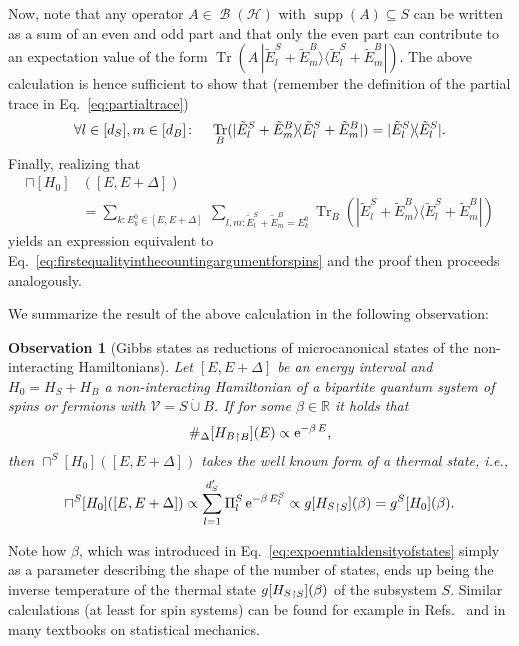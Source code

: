 \documentclass[a4paper,12pt,listof=totoc,index=totoc,bibliography=totoc,headsepline=false,headings=normal,BCOR16.153846mm,DIV12,headinclude,twoside,cleardoublepage=empty,numbers=noenddot,final]{scrreprt}
\theoremstyle{mystyle}
\numberwithin{equation}{section}
\numberwithin{figure}{section}
\numberwithin{lemma}{section}
\numberwithin{theorem}{section}
\numberwithin{corollary}{section}
\numberwithin{definition}{section}
\numberwithin{conjecture}{section}
\newtheorem{observation}{Observation}
\numberwithin{observation}{section}
\newcommand{\+}{\mkern2mu}
\newcommand{\dunion}{\mathbin{\dot{\cup}}}
\newcommand{\texteqref}[1]{Eq.~\eqref{#1}}
\newcommand{\suchthat}{\colon}
\newcommand{\itholds}{\colon\mathchoice{\quad}{}{}{}}
\renewcommand{\H}{H}
\newcommand{\rhog}{g}
\newcommand{\rhomc}{{\sqcap}}
\newcommand{\Vset}{\mathcal{V}}
\newcommand{\bra}[1]{\langle #1|}
\newcommand{\ket}[1]{|#1\rangle}
\newcommand{\ketbra}[2]{\ket{#1}\!\bra{#2}}
\newcommand{\trunc}[2]{{#1}_{\upharpoonright \mathnormal{#2}}}
\newcommand{\e}{\mathrm{e}}
\DeclareMathOperator{\1}{\mathds{1}}
\DeclareMathOperator{\Bop}{\mathcal{B}}
\DeclareMathOperator{\Tr}{Tr}
\DeclareMathOperator{\supp}{supp}
\newcommand{\mc}[1]{\mathcal{#1}}
\newcommand{\mcH}{\mc{H}}
\newcommand{\mb}[1]{\mathbb{#1}}
\newcommand{\R}{\mb{R}}
\begin{document}
Now, note that any operator $A \in \Bop(\mcH)$ with $\supp(A) \subseteq S$ can be written as a sum of an even and odd part and that only the even part can contribute to an expectation value of the form $\Tr(A\,\ketbra{\tilde E^S_l + \tilde E^B_m}{\tilde E^S_l + \tilde E^B_m})$.
The above calculation is hence sufficient to show that (remember the definition of the partial trace in \texteqref{eq:partialtrace})
\begin{equation}
  \forall l\in[d_S],m\in[d_B]\itholds \Tr_B(\ketbra{\tilde E^S_l + \tilde E^B_m}{\tilde E^S_l + \tilde E^B_m}) = \ketbra{\tilde E^S_l}{\tilde E^S_l} .
\end{equation}
Finally, realizing that
\begin{equation}
  \begin{split}
    \rhomc[\H_0]&([E,E+\Delta])\\
    &= \sum_{k\suchthat E^0_k \in [E,E+\Delta]}\ \sum_{l,m\suchthat \tilde E^S_l+\tilde E^B_m=E^0_k} \Tr_B(\ketbra{\tilde E^S_l + \tilde E^B_m}{\tilde E^S_l + \tilde E^B_m}) 
  \end{split}
\end{equation}
yields an expression equivalent to \texteqref{eq:firstequalityinthecountingargumentforspins} and the proof then proceeds analogously.

We summarize the result of the above calculation in the following observation:
\begin{observation}[Gibbs states as reductions of microcanonical states of the non-interacting Hamiltonians] \label{obs:gibbsstatesasreductionsofmicrocanonicalstates}
  Let $[E,E+\Delta]$ be an energy interval and $\H_0 = \H_S + \H_B$ a non-interacting Hamiltonian of a bipartite quantum system of spins or fermions with $\Vset = S \dunion B$. If for some $\beta \in \R$ it holds that
  \begin{equation} \label{eq:expoenntialdensityofstates}
    \#_\Delta[\trunc{\H_B}B](E) \propto \e^{-\beta\,E} ,
  \end{equation}
  then $\rhomc^S[\H_0]([E,E+\Delta])$ takes the well known form of a thermal state, i.e.,
  \begin{equation} \label{eq:noninteractingreducedmicrocanonicalstateisequaltocanonicalstate}
    \rhomc^S[\H_0]([E,E+\Delta]) \propto \sum_{l=1}^{d_S'} \Pi^S_l \, \e^{-\beta\,E^S_l} \propto \rhog[\trunc{\H_S}S](\beta) = \rhog^S[\H_0](\beta).
  \end{equation}
\end{observation}

Note how $\beta$, which was introduced in \texteqref{eq:expoenntialdensityofstates} simply as a parameter describing the shape of the number of states, ends up being the inverse temperature of the thermal state $\rhog[\trunc{\H_S}S](\beta)$ of the subsystem $S$.
Similar calculations (at least for spin systems) can be found for example in Refs.~\cite{Goldstein06,tasaki98,Reimann07,Gemmer09} and in many textbooks on statistical mechanics.
\end{document}
